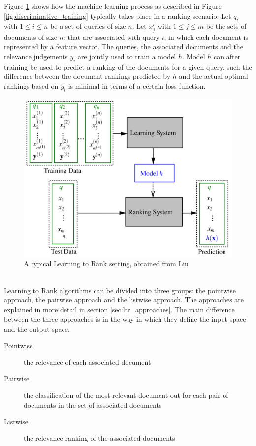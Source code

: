 Figure \ref{fig:ltr_framework} shows how the machine learning process as described in Figure \ref{fig:discriminative_training} typically takes place in a ranking scenario. Let $q_i$ with $1 \le i \le n$ be a set of queries of size $n$. Let $x_j^i$ with $1 \le j \le m$ be the sets of documents of size $m$ that are associated with query $i$, in which each document is represented by a feature vector. The queries, the associated documents and the relevance judgements $y_i$ are jointly used to train a model $h$. Model $h$ can after training be used to predict a ranking of the documents for a given query, such the difference between the document rankings predicted by $h$ and the actual optimal rankings based on $y_i$ is minimal in terms of a certain loss function.
\begin{figure}[!h]
\centering
\includegraphics[scale=0.3]{gfx/ltr_framework}
\caption{A typical Learning to Rank setting, obtained from Liu \cite{Liu2007}}
\label{fig:ltr_framework}
\end{figure}\\

Learning to Rank algorithms can be divided into three groups: the pointwise approach, the pairwise approach and the listwise approach. The approaches are explained in more detail in section \ref{sec:ltr_approaches}. The main difference between the three approaches is in the way in which they define the input space and the output space. 
\begin{description}
\item[Pointwise] the relevance of each associated document
\item[Pairwise] the classification of the most relevant document out for each pair of documents in the set of associated documents
\item[Listwise] the relevance ranking of the associated documents
\end{description}
\smallskip

